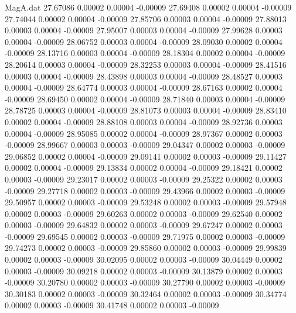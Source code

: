 \begin{filecontents}{MagA.dat}
  27.67086    0.00002    0.00004   -0.00009
  27.69408    0.00002    0.00004   -0.00009
  27.74044    0.00002    0.00004   -0.00009
  27.85706    0.00003    0.00004   -0.00009
  27.88013    0.00003    0.00004   -0.00009
  27.95007    0.00003    0.00004   -0.00009
  27.99628    0.00003    0.00004   -0.00009
  28.06752    0.00003    0.00004   -0.00009
  28.09030    0.00002    0.00004   -0.00009
  28.13716    0.00003    0.00004   -0.00009
  28.18304    0.00002    0.00004   -0.00009
  28.20614    0.00003    0.00004   -0.00009
  28.32253    0.00003    0.00004   -0.00009
  28.41516    0.00003    0.00004   -0.00009
  28.43898    0.00003    0.00004   -0.00009
  28.48527    0.00003    0.00004   -0.00009
  28.64774    0.00003    0.00004   -0.00009
  28.67163    0.00002    0.00004   -0.00009
  28.69450    0.00002    0.00004   -0.00009
  28.71840    0.00003    0.00004   -0.00009
  28.78725    0.00003    0.00004   -0.00009
  28.81073    0.00003    0.00004   -0.00009
  28.83410    0.00002    0.00004   -0.00009
  28.88108    0.00003    0.00004   -0.00009
  28.92736    0.00003    0.00004   -0.00009
  28.95085    0.00002    0.00004   -0.00009
  28.97367    0.00002    0.00003   -0.00009
  28.99667    0.00003    0.00003   -0.00009
  29.04347    0.00002    0.00003   -0.00009
  29.06852    0.00002    0.00004   -0.00009
  29.09141    0.00002    0.00003   -0.00009
  29.11427    0.00002    0.00004   -0.00009
  29.13834    0.00002    0.00004   -0.00009
  29.18421    0.00002    0.00003   -0.00009
  29.23017    0.00002    0.00003   -0.00009
  29.25322    0.00002    0.00003   -0.00009
  29.27718    0.00002    0.00003   -0.00009
  29.43966    0.00002    0.00003   -0.00009
  29.50957    0.00002    0.00003   -0.00009
  29.53248    0.00002    0.00003   -0.00009
  29.57948    0.00002    0.00003   -0.00009
  29.60263    0.00002    0.00003   -0.00009
  29.62540    0.00002    0.00003   -0.00009
  29.64832    0.00002    0.00003   -0.00009
  29.67247    0.00002    0.00003   -0.00009
  29.69545    0.00002    0.00003   -0.00009
  29.71975    0.00002    0.00003   -0.00009
  29.74273    0.00002    0.00003   -0.00009
  29.85860    0.00002    0.00003   -0.00009
  29.99839    0.00002    0.00003   -0.00009
  30.02095    0.00002    0.00003   -0.00009
  30.04449    0.00002    0.00003   -0.00009
  30.09218    0.00002    0.00003   -0.00009
  30.13879    0.00002    0.00003   -0.00009
  30.20780    0.00002    0.00003   -0.00009
  30.27790    0.00002    0.00003   -0.00009
  30.30183    0.00002    0.00003   -0.00009
  30.32464    0.00002    0.00003   -0.00009
  30.34774    0.00002    0.00003   -0.00009
  30.41748    0.00002    0.00003   -0.00009

\end{filecontents}
